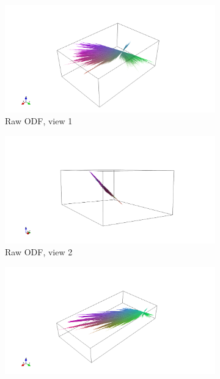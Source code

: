 \documentclass[11pt]{article}
\begin{document}
\begin{figure}[h]
  \centering
  \begin{subfigure}[b]{0.48\textwidth}
    \centering \includegraphics[width=\textwidth]{../figs/ODF_full_d2n7_view1}
    \caption{Raw ODF, view 1\label{fig:rawv1}}
  \end{subfigure}
  \hspace{1em}
  \begin{subfigure}[b]{0.48\textwidth}
    \centering \includegraphics[width=\textwidth]{../figs/ODF_full_d2n7_view2}
    \caption{Raw ODF, view 2\label{fig:rawv2}}
  \end{subfigure}
  \vspace{2em}
  \begin{subfigure}[b]{0.48\textwidth}
    \centering \includegraphics[width=\textwidth]{../figs/ODF_masked_d2n7_view1}

\end{subfigure}
\end{figure}
\end{document}

